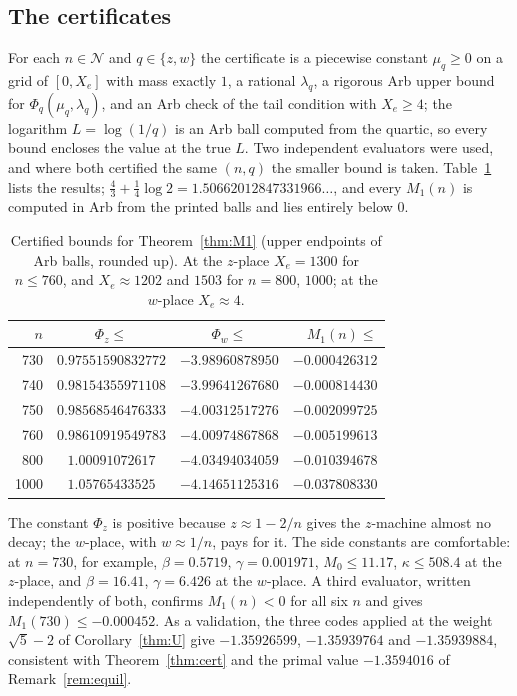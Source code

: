 \documentclass[11pt]{amsart}
\theoremstyle{definition}
\theoremstyle{remark}
\numberwithin{equation}{section}
\begin{document}
\subsection{The certificates}
For each $n\in\mathcal N$ and $q\in\{z,w\}$ the certificate is a piecewise constant $\mu_q\ge0$ on a grid of $[0,X_e]$
with mass exactly $1$, a rational $\lambda_q$, a rigorous Arb upper bound for $\Phi_q(\mu_q,\lambda_q)$, and an Arb check
of the tail condition with $X_e\ge4$; the logarithm $L=\log(1/q)$ is an Arb ball computed from the quartic, so every bound
encloses the value at the true $L$. Two independent evaluators were used, and where both certified the same $(n,q)$ the
smaller bound is taken. Table~\ref{tab:M1cert} lists the results; $\frac43+\frac14\log2=1.50662012847331966\ldots$, and
every $M_1(n)$ is computed in Arb from the printed balls and lies entirely below $0$.

\begin{table}[ht]
\centering
\begin{tabular}{@{}rccr@{}}
\toprule
$n$ & $\Phi_z\le$ & $\Phi_w\le$ & $M_1(n)\le$\\
\midrule
730 & $0.97551590832772$ & $-3.98960878950$ & $-0.000426312$\\
740 & $0.98154355971108$ & $-3.99641267680$ & $-0.000814430$\\
750 & $0.98568546476333$ & $-4.00312517276$ & $-0.002099725$\\
760 & $0.98610919549783$ & $-4.00974867868$ & $-0.005199613$\\
800 & $1.00091072617$ & $-4.03494034059$ & $-0.010394678$\\
1000 & $1.05765433525$ & $-4.14651125316$ & $-0.037808330$\\
\bottomrule
\end{tabular}
\caption{Certified bounds for Theorem~\ref{thm:M1} (upper endpoints of Arb balls, rounded up). At the $z$-place
$X_e=1300$ for $n\le760$, and $X_e\approx1202$ and $1503$ for $n=800$, $1000$; at the $w$-place $X_e\approx4$.}\label{tab:M1cert}
\end{table}

The constant $\Phi_z$ is positive because $z\approx1-2/n$ gives the $z$-machine almost no decay; the $w$-place, with
$w\approx1/n$, pays for it. The side constants are comfortable: at $n=730$, for example, $\beta=0.5719$,
$\gamma=0.001971$, $M_0\le11.17$, $\kappa\le508.4$ at the $z$-place, and $\beta=16.41$, $\gamma=6.426$ at the $w$-place.
A third evaluator, written independently of both, confirms $M_1(n)<0$ for all six $n$ and gives
$M_1(730)\le-0.000452$. As a validation, the three codes applied at the weight $\sqrt5-2$ of Corollary~\ref{thm:U} give
$-1.35926599$, $-1.35939764$ and $-1.35939884$, consistent with Theorem~\ref{thm:cert} and the primal value
$-1.3594016$ of Remark~\ref{rem:equil}.
\end{document}
